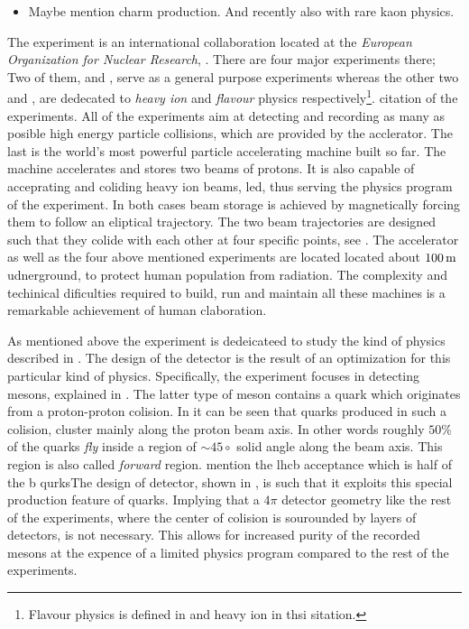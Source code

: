 \begin{itemize}
  \item Maybe mention charm production. And recently also with rare kaon physics.
\end{itemize}

The \lhcb experiment is an international collaboration located at the {\it European Organization for Nuclear Research}, \cern.
There are four major experiments there; Two of them, \atlas and \cms, serve as a general purpose experiments whereas the other
two \alice and \lhcb, are dedecated to {\it heavy ion} and {\it flavour} physics respectively\footnote{Flavour physics is  defined in and heavy ion in thsi sitation.}.
{\color{red} citation of the experiments}. All of the experiments aim at detecting and recording as many as posible high energy
particle collisions, which are provided by the \lhc acclerator. The last is the world's most powerful particle accelerating
machine built so far. The \lhc machine accelerates and stores two beams of protons. It is also capable of acceprating
and coliding heavy ion beams, \eg led, thus serving the physics program of the \alice experiment.
In both cases beam storage is achieved by magnetically forcing them to follow an eliptical trajectory.
The two beam trajectories are designed such that they colide with each other at four specific points, see \figref{}.
The \lhc accelerator as well as the four above mentioned experiments are located located about $100\rm \,m$ udnerground,
to protect human population from radiation. The complexity and techinical dificulties required to build, run and maintain
all these machines is a remarkable achievement of human claboration.

As mentioned above the \lhcb experiment is dedeicateed to study the kind of physics described in \secref{}.
The design of the \lhcb detector is the result of an optimization for this particular kind of physics.
Specifically, the experiment focuses in detecting \B mesons, explained in \secref{}. The latter type of
meson contains a \bquark quark which originates from a proton-proton colision. In \figref{} it can be seen
that \bquark quarks produced in such a colision, cluster mainly along the proton beam axis. In other words
roughly $50\%$ of the \bquark quarks {\it fly} inside a region of $\sim 45\circ$ solid angle along the beam axis.
This region is also called {\it forward} region. {\color{red} mention the lhcb acceptance  which is half of the b qurks}The design of \lhcb detector, shown in \figref{}, is such that
it exploits this special production feature of \bquark quarks. Implying that a $4\pi$ detector geometry like the
rest of the \lhc experiments, where the center of colision is sourounded by layers of detectors, is not necessary.
This allows for increased purity of the recorded \B mesons at the expence of a limited physics program compared
to the rest of the \lhcb experiments.


